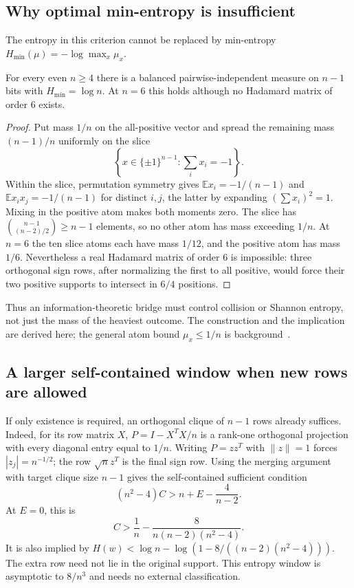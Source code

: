 \subsection{Why optimal min-entropy is insufficient}
The entropy in this criterion cannot be replaced by min-entropy
$H_{\min}(\mu)=-\log\max_x\mu_x$.
\begin{proposition}
\label{prop:minentropy-counter}
For every even $n\ge4$ there is a balanced pairwise-independent measure
on $n-1$ bits with $H_{\min}=\log n$. At $n=6$ this holds although
no Hadamard matrix of order $6$ exists.
\end{proposition}
\begin{proof}
Put mass $1/n$ on the all-positive vector and spread the remaining
mass $(n-1)/n$ uniformly on the slice
\[
 \left\{x\in\{\pm1\}^{n-1}:\sum_i x_i=-1\right\}.
\]
Within the slice, permutation symmetry gives
$\mathbb E x_i=-1/(n-1)$ and
$\mathbb E x_ix_j=-1/(n-1)$ for distinct $i,j$, the latter by
expanding $(\sum x_i)^2=1$. Mixing in the positive atom makes both
moments zero. The slice has $\binom{n-1}{(n-2)/2}\ge n-1$ elements,
so no other atom has mass exceeding $1/n$.
At $n=6$ the ten slice atoms each have mass $1/12$, and the positive
atom has mass $1/6$. Nevertheless a real Hadamard matrix of order
$6$ is impossible: three orthogonal sign rows, after normalizing
the first to all positive, would force their two positive supports
to intersect in $6/4$ positions.
\end{proof}
Thus an information-theoretic bridge must control collision or Shannon
entropy, not just the mass of the heaviest outcome. The construction
and the implication are derived here; the general atom bound
$\mu_x\le1/n$ is background~\cite{GP}.

\subsection{A larger self-contained window when new rows are allowed}
If only existence is required, an orthogonal clique of $n-1$ rows
already suffices. Indeed, for its row matrix $X$,
$P=I-X^TX/n$ is a rank-one orthogonal projection with every diagonal
entry equal to $1/n$. Writing $P=zz^T$ with $\|z\|=1$ forces
$|z_j|=n^{-1/2}$; the row $\sqrt n z^T$ is the final sign row.
Using the merging argument with target clique size $n-1$ gives the
self-contained sufficient condition
\[
 (n^2-4)C>n+E-\frac4{n-2}.
\]
At $E=0$, this is
\[
 C>\frac1n-\frac8{n(n-2)(n^2-4)}.
\]
It is also implied by
$H(w)<\log n-\log(1-8/((n-2)(n^2-4)))$.
The extra row need not lie in the original support. This entropy
window is asymptotic to $8/n^3$ and needs no external classification.

